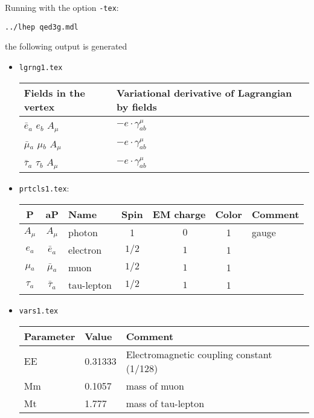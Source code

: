 \begin{frame}{}
Running with the option \lstinline{-tex}:
\begin{lstlisting}
../lhep qed3g.mdl
\end{lstlisting}
the following output is generated
\begin{itemize}
\item \lstinline{lgrng1.tex}
\begin{center}

\begin{tabular}{|l|l|} \hline
Fields in the vertex & Variational derivative of Lagrangian by fields \\ \hline
$\bar{e}{}_{a }$ \phantom{-} $e{}_{b }$ \phantom{-} ${A}_{\mu }$ \phantom{-}  &
        $- e\cdot \gamma_{a b}^\mu $\\[2mm]
$\bar{\mu}{}_{a }$ \phantom{-} $\mu{}_{b }$ \phantom{-} ${A}_{\mu }$ \phantom{-}  &
        $- e\cdot \gamma_{a b}^\mu $\\[2mm]
$\bar{\tau}{}_{a }$ \phantom{-} $\tau{}_{b }$ \phantom{-} ${A}_{\mu }$ \phantom{-}  &
        $- e\cdot \gamma_{a b}^\mu $\\ \hline
\end{tabular}

\end{center}



\item \lstinline{prtcls1.tex}:
  \begin{center}
    \begin{tabular}{|cc|l|c|c|c|l|} \hline
P & aP & Name & Spin  & EM charge & Color & Comment \\ \hline
$A_{\mu }$&$A_{\mu }$&photon        &1           & $\phantom{-}0$ &1    &gauge\\
$e{}_{a}$ &$\bar{e}{}_{a}$&electron      &$1/2$       &$\phantom{-}1$ &1    &   \\
$\mu{}_{a}$&$\bar{\mu}{}_{a}$&muon          &$1/2$       &$\phantom{-}1$ &1    &   \\
$\tau{}_{a}$&$\bar{\tau}{}_{a}$&tau-lepton    &$1/2$       &$\phantom{-}1$ &1    &   \\ \hline
\end{tabular}
  \end{center}

\item \lstinline{vars1.tex}
  \begin{center}
    \begin{tabular}{|l|l|l|} \hline
Parameter & Value & Comment \\ \hline
EE    &0.31333             &Electromagnetic coupling constant (1/128) \\
Mm    &0.1057              &mass of muon \\
Mt    &1.777               &mass of tau-lepton \\ \hline
\end{tabular}
  \end{center}
\end{itemize}


\end{frame}
